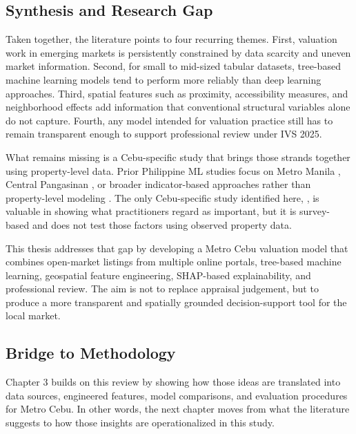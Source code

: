 \subsection{Synthesis and Research Gap}\label{synthesis-and-research-gap}

Taken together, the literature points to four recurring themes. First, valuation work in emerging markets is persistently constrained by data scarcity and uneven market information. Second, for small to mid-sized tabular datasets, tree-based machine learning models tend to perform more reliably than deep learning approaches. Third, spatial features such as proximity, accessibility measures, and neighborhood effects add information that conventional structural variables alone do not capture. Fourth, any model intended for valuation practice still has to remain transparent enough to support professional review under IVS 2025.

What remains missing is a Cebu-specific study that brings those strands together using property-level data. Prior Philippine ML studies focus on Metro Manila \parencite{perdio2023,dann2020}, Central Pangasinan \parencite{viray2023}, or broader indicator-based approaches rather than property-level modeling \parencite{ramolete2023}. The only Cebu-specific study identified here, \textcite{agosto2020}, is valuable in showing what practitioners regard as important, but it is survey-based and does not test those factors using observed property data.

This thesis addresses that gap by developing a Metro Cebu valuation model that combines open-market listings from multiple online portals, tree-based machine learning, geospatial feature engineering, SHAP-based explainability, and professional review. The aim is not to replace appraisal judgement, but to produce a more transparent and spatially grounded decision-support tool for the local market.


\subsection{Bridge to Methodology}\label{bridge-to-methodology}

Chapter 3 builds on this review by showing how those ideas are translated into data sources, engineered features, model comparisons, and evaluation procedures for Metro Cebu. In other words, the next chapter moves from what the literature suggests to how those insights are operationalized in this study.

